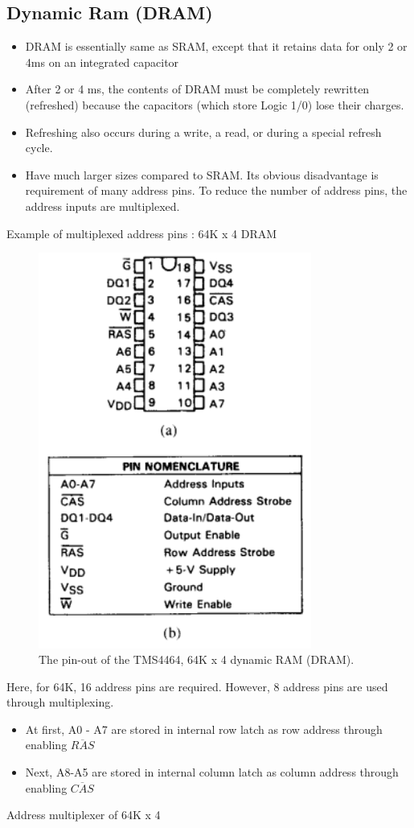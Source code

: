 \subsection{Dynamic Ram (DRAM)}
\begin{itemize}
  \item DRAM is essentially same as SRAM, except that it retains data for only 2 or 4ms on an integrated capacitor
  \item After 2 or 4 ms, the contents of DRAM must be completely rewritten (refreshed) because the capacitors (which store Logic 1/0) lose their charges.
  \item Refreshing also occurs during a write, a read, or during a special refresh cycle.
  \item Have much larger sizes compared to SRAM. Its obvious disadvantage is requirement of many address pins. To reduce the number of address pins, the address inputs are multiplexed.
\end{itemize}
\newpage
Example of multiplexed address pins : 64K x 4 DRAM
\begin{figure}[h!]
  \includegraphics[width = 0.8\textwidth]{./figures/DRAM.png}
  \caption{The pin-out of the TMS4464, 64K x 4 dynamic RAM (DRAM).}
  \label{}
\end{figure}
Here, for 64K, 16 address pins are required. However, 8 address pins are used through multiplexing.
\begin{itemize}
  \item At first, A0 - A7 are stored in internal row latch as row address through enabling $\overline{RAS}$
  \item Next, A8-A5 are stored in internal column latch as column address through enabling $\overline{CAS}$
\end{itemize}
Address multiplexer of 64K x 4


